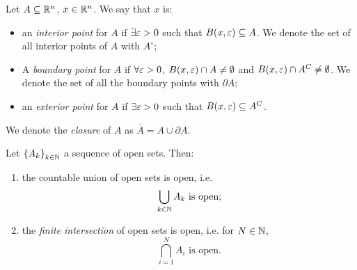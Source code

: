 \begin{definition}

    Let $A \subseteq {\mathbb{R}^n}$, $x \in {\mathbb{R}^n}$. We say that $x$ is:
    
    \begin{itemize}
        \item an \emph{interior point} for $A$ if $\exists \varepsilon > 0$ such that $B(x,\varepsilon) \subseteq A$. We denote the set of all interior points of $A$ with $A^\circ$;
        \item A \emph{boundary point} for $A$ if $\forall \varepsilon > 0$, $B(x,\varepsilon) \cap A \neq \emptyset$ and $B(x,\varepsilon) \cap A^C \neq \emptyset$. We denote the set of all the boundary points with $\partial A$;
        \item an \emph{exterior point} for $A$ if $\exists \varepsilon > 0$ such that $B(x,\varepsilon) \subseteq A^C$.
    \end{itemize}

    We denote the \emph{closure} of $A$ as $\bar{A} = A \cup \partial A$.

\end{definition}

\begin{proposition}
    
    Let $\left\{ A_k \right\}_{k \in \mathbb{N}}$ a sequence of open sets. Then:

    \begin{enumerate}
        \item[$i)$] the countable union of open sets is open, i.e.
            \[ \bigcup_{k \in \mathbb{N}} A_k \text{ is open}; \]
        \item[$ii)$] the \emph{finite intersection} of open sets is open, i.e. for $N \in \mathbb{N}$, 
            \[ \bigcap_{i  = 1}^N A_i \text{ is open}. \]
    \end{enumerate}

\end{proposition}

